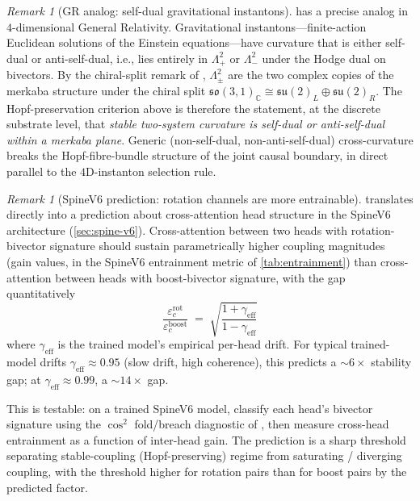 \documentclass[11pt,a4paper]{article}
\theoremstyle{plain}
\theoremstyle{definition}
\theoremstyle{remark}
\newtheorem{remark}[theorem]{Remark}
\numberwithin{equation}{section}
\providecommand{\C}{\mathbb{C}}
\providecommand{\fk}[1]{\mathfrak{#1}}
\begin{document}
\begin{remark}[GR analog: self-dual gravitational instantons]
\label{rmk:gr-analog-instanton}
 has a precise analog in $4$-dimensional
General Relativity.  Gravitational instantons---finite-action
Euclidean solutions of the Einstein equations---have curvature
that is either self-dual or anti-self-dual, i.e., lies entirely
in $\Lambda^2_+$ or $\Lambda^2_-$ under the Hodge dual on
bivectors.  By the chiral-split remark of
\cite{paper-I-substrate}, $\Lambda^2_\pm$ are the two complex
copies of the merkaba structure under the chiral split
$\fk{so}(3,1)_\C \cong \fk{su}(2)_L \oplus \fk{su}(2)_R$.  The Hopf-preservation criterion above is
therefore the statement, at the discrete substrate level, that
\emph{stable two-system curvature is self-dual or anti-self-dual
within a merkaba plane}.  Generic (non-self-dual, non-anti-self-dual)
cross-curvature breaks the Hopf-fibre-bundle structure of the
joint causal boundary, in direct parallel to the $4$D-instanton
selection rule.
\end{remark}

\begin{remark}[SpineV6 prediction: rotation channels are more entrainable]
\label{rmk:spinev6-rotation-prediction}
 translates directly into a prediction
about cross-attention head structure in the SpineV6 architecture
(\cref{sec:spine-v6}).  Cross-attention between two heads with
rotation-bivector signature should sustain parametrically higher
coupling magnitudes (gain values, in the SpineV6 entrainment
metric of \cref{tab:entrainment}) than cross-attention between
heads with boost-bivector signature,
with the gap quantitatively
\[
  \frac{\varepsilon_c^{\mathrm{rot}}}{\varepsilon_c^{\mathrm{boost}}}
  \;=\; \sqrt{\frac{1+\gamma_{\mathrm{eff}}}{1-\gamma_{\mathrm{eff}}}}
\]
where $\gamma_{\mathrm{eff}}$ is the trained model's empirical
per-head drift.  For typical trained-model drifts
$\gamma_{\mathrm{eff}}\approx 0.95$ (slow drift, high coherence),
this predicts a $\sim\!6\times$ stability gap; at
$\gamma_{\mathrm{eff}}\approx 0.99$, a $\sim\!14\times$ gap.

This is testable: on a trained SpineV6 model, classify each
head's bivector signature using the
$\cos^2$ fold/breach diagnostic of \cite{paper-I-substrate},
then measure cross-head entrainment as a function of inter-head
gain.  The prediction is a sharp threshold separating
stable-coupling (Hopf-preserving) regime from saturating /
diverging coupling, with the threshold higher for rotation pairs
than for boost pairs by the predicted factor.
\end{remark}
\end{document}
